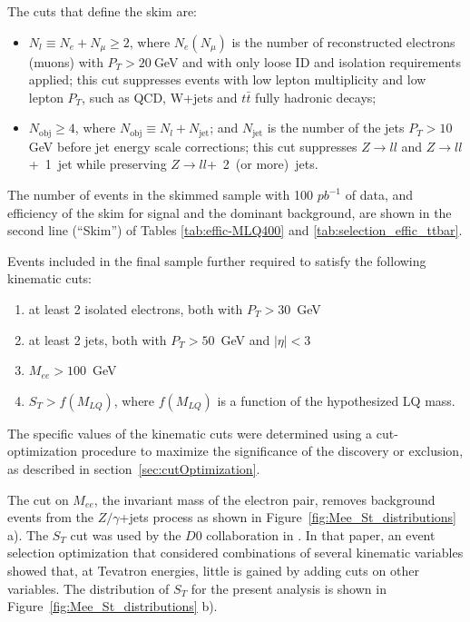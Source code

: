 \documentclass{cmspaper}
\begin{document}
\begin{linenumbers}
The cuts that define the skim  are:
\begin{itemize}
\item $N_l \equiv N_e + N_{\mu} \ge 2$, where $N_e (N_{\mu})$ is the number of reconstructed electrons (muons)
with $P_T>20~$GeV and with only loose ID and isolation requirements 
applied; this cut suppresses events with low 
lepton multiplicity and low lepton $P_T$, such as QCD, W+jets and $t\bar{t}$ fully hadronic decays;
\item $N_{\mathrm{obj}} \ge 4$, where $N_{\mathrm{obj}} \equiv N_l + N_{\mathrm{jet}}$; and
$N_{\mathrm{jet}}$ is the number of the jets $P_T > 10~$GeV before jet
energy scale corrections; this cut suppresses $Z \rightarrow ll$ and 
$Z \rightarrow ll$+~1~jet while preserving $Z \rightarrow ll$+~2~(or more)~jets.
\end{itemize}

The number of events in the skimmed sample with 100 $pb^{-1}$ of data, and 
efficiency of the skim for signal and the dominant background, are shown in the second line (``Skim'') 
of Tables
\ref{tab:effic-MLQ400} and 
\ref{tab:selection_effic_ttbar}.

Events included in the final sample further required to satisfy 
the following kinematic cuts:
%
\begin{enumerate}
\item at least 2 isolated electrons, both with $P_T>30$~GeV 
\item at least 2 jets, both with $P_T>50$~GeV and $|\eta|<3$
\item $M_{ee}>100$~GeV
\item $S_T>f(M_{LQ})$, where $f(M_{LQ})$ is a function 
of the hypothesized LQ mass.
\end{enumerate}
%

The specific values of the kinematic cuts were determined 
using a cut-optimization procedure to maximize the significance of
the discovery or exclusion, as described in section~\ref{sec:cutOptimization}.

The cut on $M_{ee}$, the invariant mass of the electron pair, 
removes background events from the
$Z/\gamma$+jets process as shown in Figure~\ref{fig:Mee_St_distributions} a).
The $S_T$ cut was used by the $D0$ collaboration in 
\cite{Abazov:2001mx}. In that paper, an event 
selection optimization that considered
combinations of several kinematic variables 
showed that, at Tevatron energies,  little is gained by 
adding cuts on other variables. The distribution of $S_T$ for the present
analysis is shown in Figure~\ref{fig:Mee_St_distributions} b).



\end{linenumbers}
\end{document}
